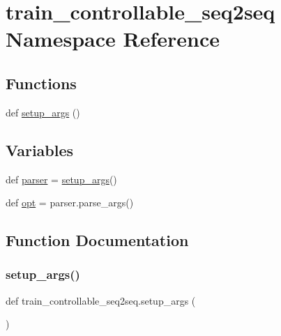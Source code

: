 \hypertarget{namespacetrain__controllable__seq2seq}{}\section{train\+\_\+controllable\+\_\+seq2seq Namespace Reference}
\label{namespacetrain__controllable__seq2seq}
\subsection*{Functions}
\begin{DoxyCompactItemize}
\item 
def \hyperlink{namespacetrain__controllable__seq2seq_a4afda2353930467d7f816e6e0f774d99}{setup\+\_\+args} ()
\end{DoxyCompactItemize}
\subsection*{Variables}
\begin{DoxyCompactItemize}
\item 
def \hyperlink{namespacetrain__controllable__seq2seq_a8f25ecefcc690c1407b6bac556c8ab13}{parser} = \hyperlink{namespacetrain__controllable__seq2seq_a4afda2353930467d7f816e6e0f774d99}{setup\+\_\+args}()
\item 
def \hyperlink{namespacetrain__controllable__seq2seq_ae13118765a317be1b58b2c0af610def7}{opt} = parser.\+parse\+\_\+args()
\end{DoxyCompactItemize}


\subsection{Function Documentation}
\mbox{\label{namespacetrain__controllable__seq2seq_a4afda2353930467d7f816e6e0f774d99}} 
\subsubsection{\texorpdfstring{setup\+\_\+args()}{setup\_args()}}
{\footnotesize\ttfamily def train\+\_\+controllable\+\_\+seq2seq.\+setup\+\_\+args (\begin{DoxyParamCaption}{ }\end{DoxyParamCaption})}

